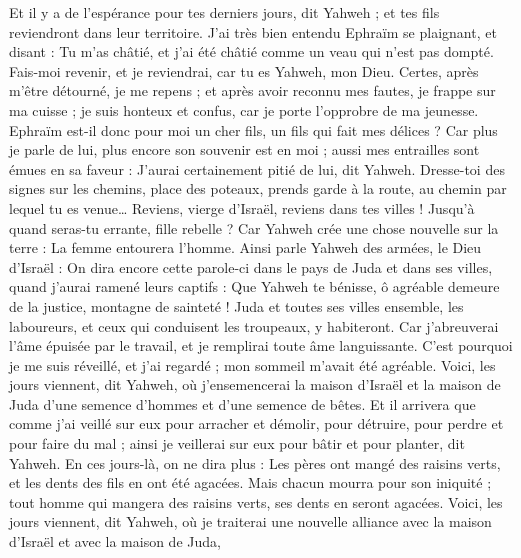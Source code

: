 \begin{multicols}{2}
Et il y a de l'espérance pour tes derniers jours, dit Yahweh ; et tes fils reviendront dans leur territoire.
J'ai très bien entendu Ephraïm se plaignant, et disant : Tu m'as châtié, et j'ai été châtié comme un veau qui n'est pas dompté. Fais-moi revenir, et je reviendrai, car tu es Yahweh, mon Dieu.
Certes, après m'être détourné, je me repens ; et après avoir reconnu mes fautes, je frappe sur ma cuisse ; je suis honteux et confus, car je porte l'opprobre de ma jeunesse.
Ephraïm est-il donc pour moi un cher fils, un fils qui fait mes délices ? Car plus je parle de lui, plus encore son souvenir est en moi ; aussi mes entrailles sont émues en sa faveur : J'aurai certainement pitié de lui, dit Yahweh.
Dresse-toi des signes sur les chemins, place des poteaux, prends garde à la route, au chemin par lequel tu es venue… Reviens, vierge d'Israël, reviens dans tes villes !
Jusqu'à quand seras-tu errante, fille rebelle ? Car Yahweh crée une chose nouvelle sur la terre : La femme entourera l'homme.
Ainsi parle Yahweh des armées, le Dieu d'Israël : On dira encore cette parole-ci dans le pays de Juda et dans ses villes, quand j'aurai ramené leurs captifs : Que Yahweh te bénisse, ô agréable demeure de la justice, montagne de sainteté !
Juda et toutes ses villes ensemble, les laboureurs, et ceux qui conduisent les troupeaux, y habiteront.
Car j'abreuverai l'âme épuisée par le travail, et je remplirai toute âme languissante.
C'est pourquoi je me suis réveillé, et j'ai regardé ; mon sommeil m'avait été agréable.
Voici, les jours viennent, dit Yahweh, où j'ensemencerai la maison d'Israël et la maison de Juda d'une semence d'hommes et d'une semence de bêtes.
Et il arrivera que comme j'ai veillé sur eux pour arracher et démolir, pour détruire, pour perdre et pour faire du mal ; ainsi je veillerai sur eux pour bâtir et pour planter, dit Yahweh.
En ces jours-là, on ne dira plus : Les pères ont mangé des raisins verts, et les dents des fils en ont été agacées.
Mais chacun mourra pour son iniquité ; tout homme qui mangera des raisins verts, ses dents en seront agacées.
Voici, les jours viennent, dit Yahweh, où je traiterai une nouvelle alliance avec la maison d'Israël et avec la maison de Juda,

\end{multicols}
